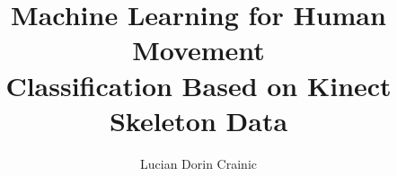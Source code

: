 \documentclass[binding=0.6cm]{sapthesis}
\title{Machine Learning for Human Movement\\ Classification Based on Kinect Skeleton Data}
\author{Lucian Dorin Crainic}
\begin{document}
\lstset{language=Python}

\frontmatter

\maketitle

\dedication{
    It does not matter how slowly you go as long as you do not stop. 
}



\cleardoublepage

\tableofcontents
\let\cleardoublepage\clearpage

\mainmatter













\backmatter
{}



\end{document}
